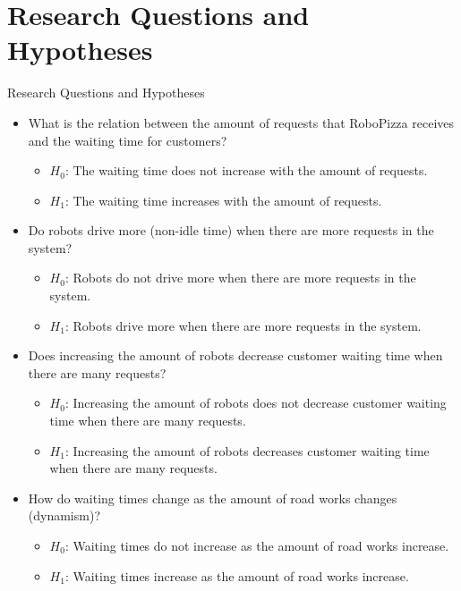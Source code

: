 \section{Research Questions and Hypotheses}

\begin{frame}[allowframebreaks]{Research Questions and Hypotheses}
    \begin{itemize}
        \item What is the relation between the amount of requests that RoboPizza receives and the waiting time for customers?
        \begin{itemize}
                \item $H_0$: The waiting time does not increase with the amount of requests.
                \item $H_1$: The waiting time increases with the amount of requests.
        \end{itemize}

        \item Do robots drive more (non-idle time) when there are more requests in the system?
        \begin{itemize}
                \item $H_0$: Robots do not drive more when there are more requests in the system.
                \item $H_1$: Robots drive more when there are more requests in the system.
        \end{itemize}

        \framebreak

        \item Does increasing the amount of robots decrease customer waiting time when there are many requests?
        \begin{itemize}
                \item $H_0$: Increasing the amount of robots does not decrease customer waiting time when there are many requests.
                \item $H_1$: Increasing the amount of robots decreases customer waiting time when there are many requests.
        \end{itemize}

        \item How do waiting times change as the amount of road works changes (dynamism)?
        \begin{itemize}
            \item $H_0$: Waiting times do not increase as the amount of road works increase.
            \item $H_1$: Waiting times increase as the amount of road works increase.
        \end{itemize}
    \end{itemize}
\end{frame}
